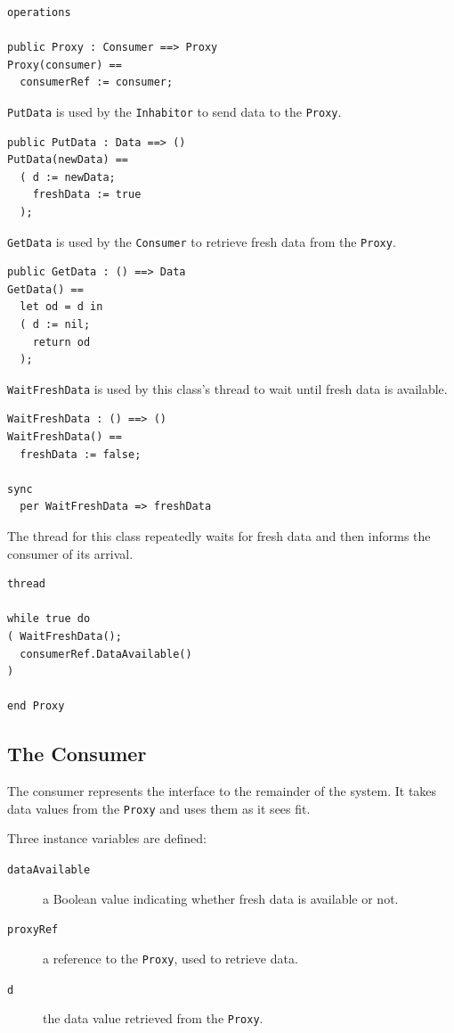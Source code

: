 \documentclass{overturerepchap}
\begin{document}
\begin{lstlisting}
operations

public Proxy : Consumer ==> Proxy
Proxy(consumer) ==
  consumerRef := consumer;
\end{lstlisting}

\texttt{PutData} is used by the \texttt{Inhabitor} to send data to the
\texttt{Proxy}.

\begin{lstlisting}
public PutData : Data ==> ()
PutData(newData) ==
  ( d := newData;
    freshData := true
  );
\end{lstlisting}

\texttt{GetData} is used by the \texttt{Consumer} to retrieve fresh
data from the \texttt{Proxy}.

\begin{lstlisting}
public GetData : () ==> Data
GetData() ==
  let od = d in
  ( d := nil;
    return od
  );
\end{lstlisting}

\texttt{WaitFreshData} is used by this class's thread to wait until
fresh data is available.

\begin{lstlisting}
WaitFreshData : () ==> ()
WaitFreshData() ==
  freshData := false;

sync
  per WaitFreshData => freshData
\end{lstlisting}

The thread for this class repeatedly waits for fresh data and then
informs the consumer of its arrival.

\begin{lstlisting}
thread

while true do
( WaitFreshData();
  consumerRef.DataAvailable()
)

end Proxy
\end{lstlisting}

\subsection{The Consumer}

The consumer represents the interface to the remainder of the
system. It takes data values from the \texttt{Proxy} and uses them as
it sees fit.

Three instance variables are defined:

\begin{description}
\item[\texttt{dataAvailable}] a Boolean value indicating whether fresh
data is available or not.
\item[\texttt{proxyRef}] a reference to the \texttt{Proxy}, used to
retrieve data.
\item[\texttt{d}] the data value retrieved from the \texttt{Proxy}.
\end{description}
\end{document}
